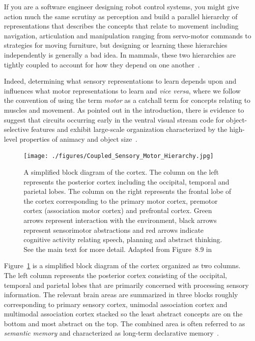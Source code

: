 \documentclass[letterpaper,11pt]{article}
\def\urlh#1{{}}
\begin{document}
If you are a software engineer designing robot control systems, you might give action much the same scrutiny as perception and build a parallel hierarchy of representations that describes the concepts that relate to movement including navigation, articulation and manipulation ranging from servo-motor commands to strategies for moving furniture, but designing or learning these hierarchies independently is generally a bad idea. In mammals, these two hierarchies are tightly coupled to account for how they depend on one another~\cite{FusterPREFRONTAL-CORTEX-15}.

Indeed, determining what sensory representations to learn depends upon and influences what motor representations to learn and {\it{vice versa}}, where we follow the convention of using the term {\it{motor}} as a catchall term for concepts relating to muscles and movement. As pointed out in the introduction, there is evidence to suggest that circuits occurring early in the ventral visual stream code for object-selective features and exhibit large-scale organization characterized by the high-level properties of animacy and object size~\cite{KonkleandCaramazzaJoN-13,LongetalPNAS-18}.


\begin{figure}
%
  \begin{center} 
    \texttt{[image: ./figures/Coupled\_Sensory\_Motor\_Hierarchy.jpg]} %
  \end{center}
%
  \caption{A simplified block diagram of the cortex. The column on the left represents the posterior cortex including the occipital, temporal and parietal lobes. The column on the right represents the frontal lobe of the cortex corresponding to the primary motor cortex, premotor cortex (association motor cortex) and prefrontal cortex. Green arrows represent interaction with the environment, black arrows represent sensorimotor abstractions and red arrows indicate cognitive activity relating speech, planning and abstract thinking. See the main text for more detail. Adapted from Figure~8.9 in~\cite{FusterPREFRONTAL-CORTEX-15-CHAPTER_8}}
%    
  \label{fig_coupled}
%
\end{figure}


Figure~{\urlh{#fig_Coupled_Sensory_Motor_Hierarchy}{\ref{fig_coupled}}} is a simplified block diagram of the cortex organized as two columns. The left column represents the posterior cortex consisting of the occipital, temporal and parietal lobes that are primarily concerned with processing sensory information. The relevant brain areas are summarized in three blocks roughly corresponding to primary sensory cortex, unimodal association cortex and multimodal association cortex stacked so the least abstract concepts are on the bottom and most abstract on the top. The combined area is often referred to as {\it{semantic memory}} and characterized as long-term declarative memory~\cite{BinderandDesaiTiCS-11}. 
\end{document}
